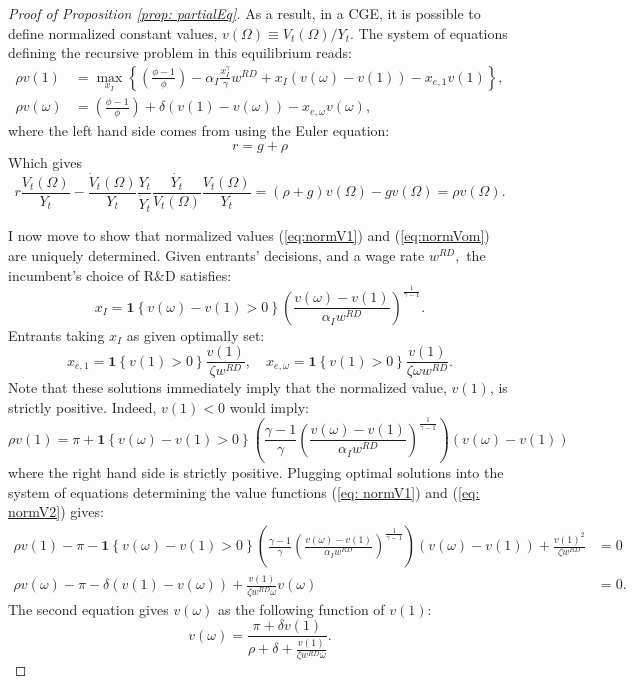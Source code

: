 \begin{proof}[Proof of Proposition \ref{prop: partialEq}]
As a result, in a CGE, it is possible to define normalized constant
values, $v(\Omega)\equiv V_{t}(\Omega)/Y_{t}$. The system of equations
defining the recursive problem in this equilibrium reads:
\begin{align}
\rho v(1) & =\max_{x_{I}}\left\{ \left(\frac{\phi-1}{\phi}\right)-\alpha_{I}\frac{x_{I}^{\gamma}}{\gamma}w^{RD}+x_{I}\left(v(\omega)-v(1)\right)-x_{e,1}v(1)\right\} ,\label{eq:normV1}\\
\rho v(\omega) & =\left(\frac{\phi-1}{\phi}\right)+\delta\left(v(1)-v(\omega)\right)-x_{e,\omega}v(\omega),\label{eq:normVom}
\end{align}
where the left hand side comes from using the Euler equation:
\[
r=g+\rho
\]
Which gives 
\[
r\frac{V_{t}(\Omega)}{Y_{t}}-\frac{\dot{V}_{t}(\Omega)}{Y_{t}}\frac{Y_{t}}{\dot{Y}_{t}}\frac{\dot{Y_{t}}}{V_{t}(\Omega)}\frac{V_{t}(\Omega)}{Y_{t}}=\left(\rho+g\right)v(\Omega)-gv(\Omega)=\rho v(\Omega).
\]

I now move to show that normalized values (\ref{eq:normV1}) and (\ref{eq:normVom})
are uniquely determined. Given entrants' decisions, and a wage rate
$w^{RD},$ the incumbent's choice of R\&D satisfies:
\[
x_{I}=\bm{1}\left\{ v(\omega)-v(1)>0\right\} \left(\frac{v(\omega)-v(1)}{\alpha_{I}w^{RD}}\right)^{\frac{1}{\gamma-1}}.
\]
Entrants taking $x_{I}$ as given optimally set:
\[
x_{e,1}=\bm{1}\left\{ v(1)>0\right\} \frac{v(1)}{\zeta w^{RD}},\quad x_{e,\omega}=\bm{1}\left\{ v(1)>0\right\} \frac{v(1)}{\zeta\omega w^{RD}}.
\]
Note that these solutions immediately imply that the normalized value,
$v(1)$, is strictly positive. Indeed, $v(1)<0$ would imply:
\[
\rho v(1)=\pi+\bm{1}\left\{ v(\omega)-v(1)>0\right\} \left(\frac{\gamma-1}{\gamma}\left(\frac{v(\omega)-v(1)}{\alpha_{I}w^{RD}}\right)^{\frac{1}{\gamma-1}}\right)\left(v(\omega)-v(1)\right)
\]
where the right hand side is strictly positive. Plugging optimal solutions
into the system of equations determining the value functions (\ref{eq: normV1})
and (\ref{eq: normV2}) gives:
\begin{align}
\rho v(1)-\pi-\bm{1}\left\{ v(\omega)-v(1)>0\right\} \left(\frac{\gamma-1}{\gamma}\left(\frac{v(\omega)-v(1)}{\alpha_{I}w^{RD}}\right)^{\frac{1}{\gamma-1}}\right)\left(v(\omega)-v(1)\right)+\frac{v(1)^{2}}{\zeta w^{RD}} & =0\label{eq: sys1-3}\\
\rho v(\omega)-\pi-\delta\left(v(1)-v(\omega)\right)+\frac{v(1)}{\zeta w^{RD}\omega}v(\omega) & =0.\label{eq: sys2-3}
\end{align}
The second equation gives $v(\omega)$ as the following function of
$v(1):$
\[
v(\omega)=\frac{\pi+\delta v(1)}{\rho+\delta+\frac{v(1)}{\zeta w^{RD}\omega}}.
\]


\end{proof}
